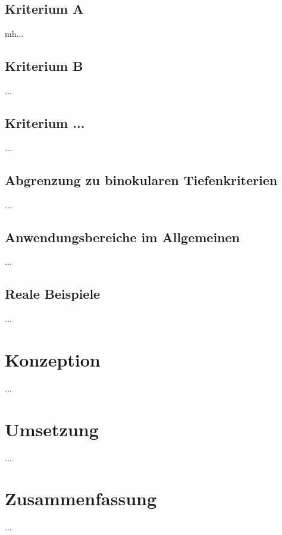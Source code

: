 \subsection{Kriterium A}
mh...

\subsection{Kriterium B}
...

\subsection{Kriterium ...}
...

\subsection{Abgrenzung zu binokularen Tiefenkriterien}
...

\subsection{Anwendungsbereiche im Allgemeinen}
...

\subsection{Reale Beispiele}
...

\section{Konzeption}
...

\section{Umsetzung}
...

\section{Zusammenfassung}
...